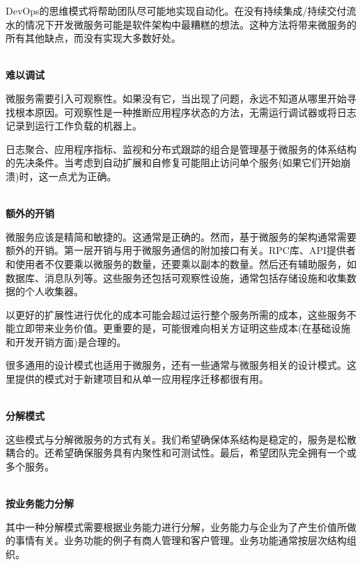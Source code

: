 DevOps的思维模式将帮助团队尽可能地实现自动化。在没有持续集成/持续交付流水的情况下开发微服务可能是软件架构中最糟糕的想法。这种方法将带来微服务的所有其他缺点，而没有实现大多数好处。

\hspace*{\fill} \\ %
\noindent
\textbf{难以调试}

微服务需要引入可观察性。如果没有它，当出现了问题，永远不知道从哪里开始寻找根本原因。可观察性是一种推断应用程序状态的方法，无需运行调试器或将日志记录到运行工作负载的机器上。

日志聚合、应用程序指标、监视和分布式跟踪的组合是管理基于微服务的体系结构的先决条件。当考虑到自动扩展和自修复可能阻止访问单个服务(如果它们开始崩溃)时，这一点尤为正确。

\hspace*{\fill} \\ %
\noindent
\textbf{额外的开销}

微服务应该是精简和敏捷的。这通常是正确的。然而，基于微服务的架构通常需要额外的开销。第一层开销与用于微服务通信的附加接口有关。RPC库、API提供者和使用者不仅要乘以微服务的数量，还要乘以副本的数量。然后还有辅助服务，如数据库、消息队列等。这些服务还包括可观察性设施，通常包括存储设施和收集数据的个人收集器。

以更好的扩展性进行优化的成本可能会超过运行整个服务所需的成本，这些服务不能立即带来业务价值。更重要的是，可能很难向相关方证明这些成本(在基础设施和开发开销方面)是合理的。


很多通用的设计模式也适用于微服务，还有一些通常与微服务相关的设计模式。这里提供的模式对于新建项目和从单一应用程序迁移都很有用。

\hspace*{\fill} \\ %
\noindent
\textbf{分解模式}

这些模式与分解微服务的方式有关。我们希望确保体系结构是稳定的，服务是松散耦合的。还希望确保服务具有内聚性和可测试性。最后，希望团队完全拥有一个或多个服务。

\hspace*{\fill} \\ %
\noindent
\textbf{按业务能力分解}

其中一种分解模式需要根据业务能力进行分解，业务能力与企业为了产生价值所做的事情有关。业务功能的例子有商人管理和客户管理。业务功能通常按层次结构组织。


